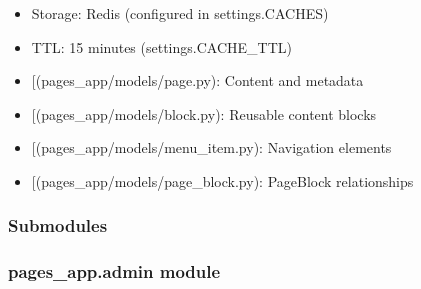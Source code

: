 \documentclass[letterpaper,10pt,english]{sphinxmanual}
\begin{document}
\begin{fulllineitems}
\begin{description}
\begin{itemize}
\item {} 
\sphinxAtStartPar
Storage: Redis (configured in settings.CACHES)

\item {} 
\sphinxAtStartPar
TTL: 15 minutes (settings.CACHE\_TTL)

\end{itemize}

\begin{itemize}
\item {} 
\sphinxAtStartPar
{[}\sphinxtitleref{Page}{]}(pages\_app/models/page.py): Content and metadata

\item {} 
\sphinxAtStartPar
{[}\sphinxtitleref{Block}{]}(pages\_app/models/block.py): Reusable content blocks

\item {} 
\sphinxAtStartPar
{[}\sphinxtitleref{MenuItem}{]}(pages\_app/models/menu\_item.py): Navigation elements

\item {} 
\sphinxAtStartPar
{[}\sphinxtitleref{PageBlock}{]}(pages\_app/models/page\_block.py): Page\sphinxhyphen{}Block relationships

\end{itemize}

\end{description}

\end{fulllineitems}



\subsubsection{Submodules}
\label{\detokenize{pages_app:submodules}}

\subsubsection{pages\_app.admin module}
\label{\detokenize{pages_app:module-pages_app.admin}}\label{\detokenize{pages_app:pages-app-admin-module}}
\end{document}
